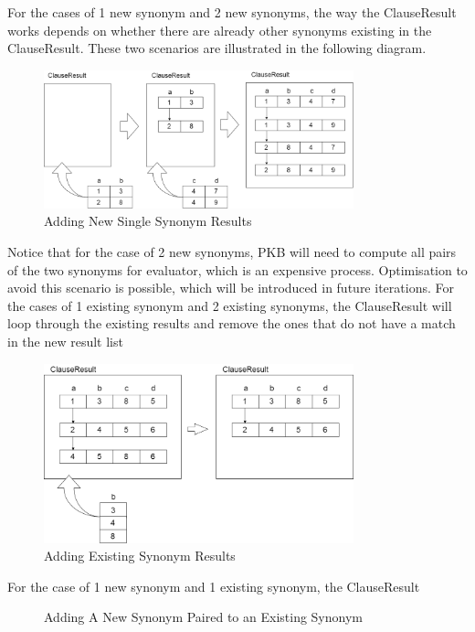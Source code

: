 \documentclass[12pt]{article}
\begin{document}
{{{{{{{{{{\begin{enumerate}
\begin{table}[!htbp]
\end{table}
\newline For the cases of 1 new synonym and 2 new synonyms, the way the ClauseResult works depends on whether there are already other synonyms existing in the ClauseResult. These two scenarios are illustrated in the following diagram.
\begin{figure}[!htbp]
  \centering 
  \caption{Adding New Single Synonym Results}
 \includegraphics[width=0.8\textwidth]{ClauseResult_AddTwoNew.png}
\end{figure}
\newline Notice that for the case of 2 new synonyms, PKB will need to compute all pairs of the two synonyms for evaluator, which is an expensive process. Optimisation to avoid this scenario is possible, which will be introduced in future iterations. \newline For the cases of 1 existing synonym and 2 existing synonyms, the ClauseResult will loop through the existing results and remove the ones that do not have a match in the new result list
\begin{figure}[!htbp]
  \centering 
  \caption{Adding Existing Synonym Results}
 \includegraphics[width=0.8\textwidth]{ClauseResult_AddExistingSynonym.png}
\end{figure}For the case of 1 new synonym and 1 existing synonym, the ClauseResult 
\begin{figure}[!htbp]
  \centering 
  \caption{Adding A New Synonym Paired to an Existing Synonym}

\end{figure}
\end{enumerate}}}}}}}}}}}
\end{document}
